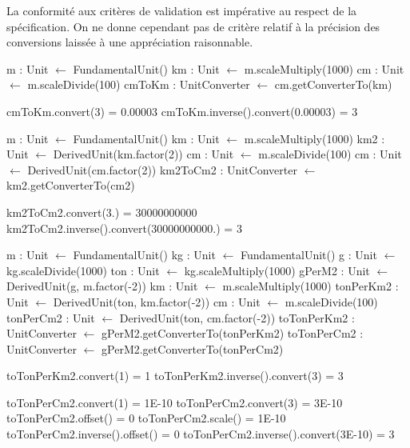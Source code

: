 \documentclass[a4paper,twoside,10pt]{article}
\begin{document}
La conformité aux critères de validation est impérative au respect de la spécification. On ne donne cependant pas de
critère relatif à la précision des conversions laissée à une appréciation raisonnable.


\begin{algorithm}[!h]
\caption{Test d'unités transformées}\label{transformedTest}
\begin{algorithmic}

\State m : Unit $\gets$ FundamentalUnit()
\State km : Unit $\gets$ m.scaleMultiply(1000)
\State cm : Unit $\gets$ m.scaleDivide(100)
\State cmToKm : UnitConverter $\gets$ cm.getConverterTo(km)

\Require cmToKm.convert(3) = 0.00003
\Require cmToKm.inverse().convert(0.00003) = 3
\EndProcedure
\end{algorithmic}
\end{algorithm}

\begin{algorithm}[!h]
\caption{Test d'unités dérivées}\label{derivedTest}
\begin{algorithmic}

\State m : Unit $\gets$ FundamentalUnit()
\State km : Unit $\gets$ m.scaleMultiply(1000)
\State km2 : Unit $\gets$ DerivedUnit(km.factor(2))
\State cm : Unit $\gets$ m.scaleDivide(100)
\State cm : Unit $\gets$ DerivedUnit(cm.factor(2))
\State km2ToCm2 : UnitConverter $\gets$ km2.getConverterTo(cm2)

\Require km2ToCm2.convert(3.) = 30000000000
\Require km2ToCm2.inverse().convert(30000000000.) = 3
\EndProcedure
\end{algorithmic}
\end{algorithm}

\begin{algorithm}[!h]
\caption{Test d'unités dérivées (dimensions combinées)}\label{combinedDerivedTest}
\begin{algorithmic}

\State m : Unit $\gets$ FundamentalUnit()
\State kg : Unit $\gets$ FundamentalUnit()
\State g : Unit $\gets$ kg.scaleDivide(1000)
\State ton : Unit $\gets$ kg.scaleMultiply(1000)
\State gPerM2 : Unit $\gets$ DerivedUnit(g, m.factor(-2))
\State km : Unit $\gets$ m.scaleMultiply(1000)
\State tonPerKm2 : Unit $\gets$ DerivedUnit(ton, km.factor(-2))
\State cm : Unit $\gets$ m.scaleDivide(100)
\State tonPerCm2 : Unit $\gets$ DerivedUnit(ton, cm.factor(-2))
\State toTonPerKm2 : UnitConverter $\gets$ gPerM2.getConverterTo(tonPerKm2)
\State toTonPerCm2 : UnitConverter $\gets$ gPerM2.getConverterTo(tonPerCm2)

\Require toTonPerKm2.convert(1) = 1
\Require toTonPerKm2.inverse().convert(3) = 3

\Require toTonPerCm2.convert(1) = 1E-10
\Require toTonPerCm2.convert(3) = 3E-10
\Require toTonPerCm2.offset() = 0
\Require toTonPerCm2.scale() = 1E-10
\Require toTonPerCm2.inverse().offset() = 0
\Require toTonPerCm2.inverse().convert(3E-10) = 3
\EndProcedure
\end{algorithmic}
\end{algorithm}
\end{document}
